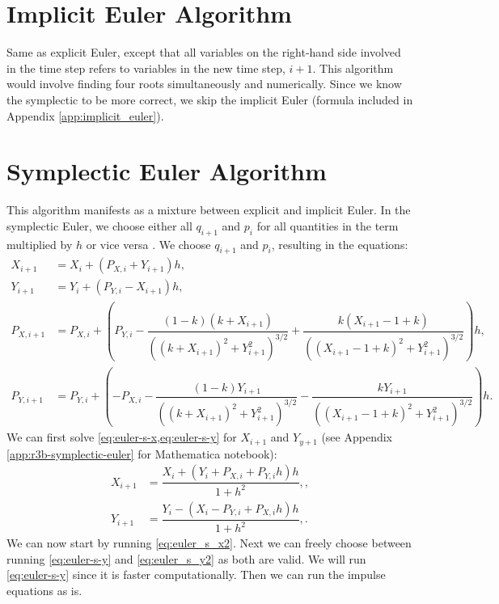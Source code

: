 \section{Implicit Euler Algorithm}
Same as explicit Euler, except that all variables on the right-hand side involved in the time step refers to variables in the new time step, $i+1$. This algorithm would involve finding four roots simultaneously and numerically. Since we know the symplectic to be more correct, we skip the implicit Euler (formula included in Appendix \ref{app:implicit_euler}).

\section{Symplectic Euler Algorithm}
This algorithm manifests as a mixture between explicit and implicit Euler. In the symplectic Euler, we choose either all $q_{i+1}$ and $p_i$ for all quantities in the term multiplied by $h$ or vice versa \cite{Hairer}. We choose $q_{i+1}$ and $p_i$, resulting in the equations:
\begin{align}
    X_{i+1} &= X_i + (P_{X,i} + Y_{i+1})h, \label{eq:euler-s-x} \\[0.2cm]
    Y_{i+1} &= Y_i + (P_{Y,i} - X_{i+1})h , \label{eq:euler-s-y} \\[0.2cm]
    P_{X,i+1} &= P_{X,i} + \left(P_{Y,i} - \dfrac{(1-k)(k+X_{i+1})}{((k+X_{i+1})^2+Y_{i+1}^2)^{3/2}} + \dfrac{k(X_{i+1}-1+k)}{((X_{i+1}-1+k)^2+Y_{i+1}^2)^{3/2}}\right)h, \label{eq:euler-s-px} \\[0.2cm]
    P_{Y,i+1} &= P_{Y,i} + \left(-P_{X,i} - \dfrac{(1-k)Y_{i+1}}{((k+X_{i+1})^2+Y_{i+1}^2)^{3/2}} - \dfrac{k Y_{i+1}}{((X_{i+1}-1+k)^2+Y_{i+1}^2)^{3/2}}\right)h. \label{eq:euler-s-py}
\end{align}
We can first solve \cref{eq:euler-s-x,eq:euler-s-y} for $X_{i+1}$ and $Y_{y+1}$ (see Appendix \ref{app:r3b-symplectic-euler} for Mathematica notebook):
\begin{align}
X_{i+1} &= \dfrac{X_i + (Y_i + P_{X,i} + P_{Y,i} h) h}{1+h^2}, \label{eq:euler_s_x2} , \\[0.5cm]
Y_{i+1} &= \dfrac{Y_i - (X_i - P_{Y,i} + P_{X,i} h) h}{1+h^2}, \label{eq:euler_s_y2}.
\end{align}
We can now start by running \cref{eq:euler_s_x2}. Next we can freely choose between running \cref{eq:euler-s-y} and \cref{eq:euler_s_y2} as both are valid. We will run \cref{eq:euler-s-y} since it is faster computationally. Then we can run the impulse equations as is.


